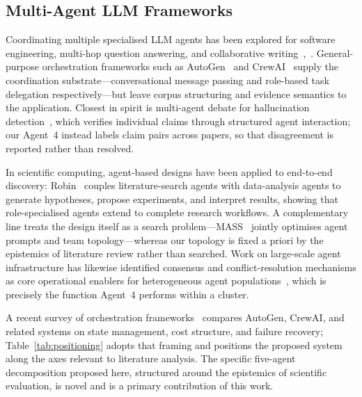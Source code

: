 \documentclass[conference]{IEEEtran}
\begin{document}
\subsection{Multi-Agent LLM Frameworks}
Coordinating multiple specialised LLM agents has been explored for software
engineering, multi-hop question answering, and collaborative
writing~\cite{park2023generative},~\cite{guo2024survey}. General-purpose
orchestration frameworks such as AutoGen~\cite{wu2023autogen} and
CrewAI~\cite{moura2024crewai} supply the coordination
substrate---conversational message passing and role-based task delegation
respectively---but leave corpus structuring and evidence semantics to the
application. Closest in spirit is multi-agent debate for hallucination
detection~\cite{sun2025debate}, which verifies individual claims through
structured agent interaction; our Agent~4 instead labels claim pairs across
papers, so that disagreement is reported rather than resolved.

In scientific computing, agent-based designs have been applied to end-to-end
discovery: Robin~\cite{ghareeb2026robin} couples literature-search agents with
data-analysis agents to generate hypotheses, propose experiments, and
interpret results, showing that role-specialised agents extend to complete
research workflows. A complementary line treats the design itself as a search
problem---MASS~\cite{zhou2026mass} jointly optimises agent prompts and team
topology---whereas our topology is fixed a priori by the epistemics of
literature review rather than searched. Work on large-scale agent
infrastructure has likewise identified consensus and conflict-resolution
mechanisms as core operational enablers for heterogeneous agent
populations~\cite{wang2026ioa}, which is precisely the function Agent~4
performs within a cluster.

A recent survey of orchestration frameworks~\cite{zhu2026orchestration}
compares AutoGen, CrewAI, and related systems on state management, cost
structure, and failure recovery; Table~\ref{tab:positioning} adopts that
framing and positions the proposed system along the axes relevant to
literature analysis. The specific five-agent decomposition proposed here,
structured around the epistemics of scientific evaluation, is novel and is a
primary contribution of this work.
\end{document}
